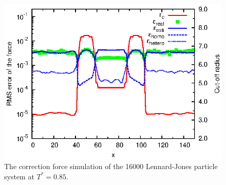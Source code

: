 \documentclass[aps,pre,preprint]{revtex4}
\begin{document}




\begin{figure}
  \centering
  \includegraphics[]{fig/t0.85-n16000-adapt-e0.0045-extend/rcut.and.error.eps}
  \caption{The correction force simulation of the 16000 Lennard-Jones
    particle system at $T^\ast=0.85$.}
  \label{fig:tmp3}
\end{figure}
\end{document}
